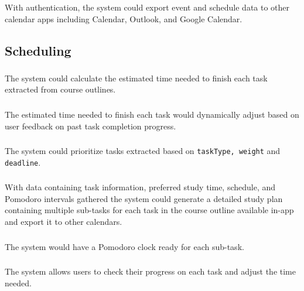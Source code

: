 \documentclass[12pt]{article}
\begin{document}
\subsubsection{}
With authentication, the system could export event and schedule data to other calendar apps including Calendar, Outlook, and Google Calendar.




\subsection{Scheduling}
\subsubsection{}
The system could calculate the estimated time needed to finish each task extracted from course outlines. 

\subsubsection{}
The estimated time needed to finish each task would dynamically adjust based on user feedback on past task completion progress.

\subsubsection{}
The system could prioritize tasks extracted based on \texttt{taskType, weight} and \texttt{deadline}.

\subsubsection{}
With data containing task information, preferred study time, schedule, and Pomodoro intervals gathered the system could generate a detailed study plan containing multiple sub-tasks for each task in the course outline available in-app and export it to other calendars.


\subsubsection{}
The system would have a Pomodoro clock ready for each sub-task.



\subsubsection{}
The system allows users to check their progress on each task and adjust the time needed.
\end{document}
